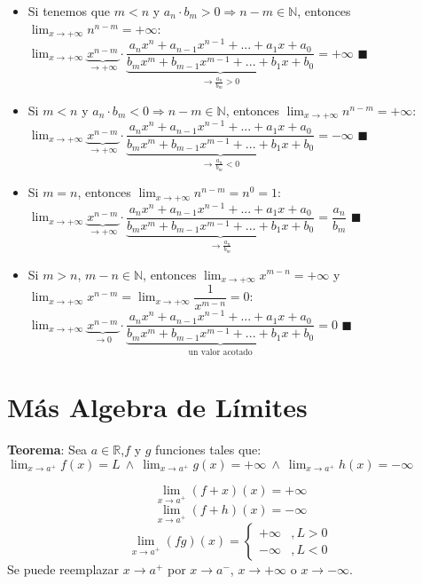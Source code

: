 \documentclass[11pt,a4paper]{article}
\newcommand*{\QEDA}{\null\nobreak\hfill\ensuremath{\blacksquare}}
\begin{document}
\begin{itemize}
\begin{itemize}
\item Si tenemos que $m<n$ y $a_n\cdot b_m > 0 \Rightarrow n-m \in \mathbb{N}$, entonces $\displaystyle{\lim_{x \to +\infty} n^{n-m} = +\infty}$:\\
$\displaystyle{\lim_{x \to +\infty} \underbrace{x^{n-m}}_{\to +\infty} \cdot \underbrace{\dfrac{a_nx^n + a_{n-1}x^{n-1} + ... + a_1x + a_0}{b_mx^m + b_{m-1}x^{m-1} + ... + b_1x + b_0}}_{\to \frac{a_n}{b_m} > 0} = +\infty}$ \QEDA
\item Si $m<n$ y $a_n\cdot b_m < 0 \Rightarrow n-m \in \mathbb{N}$, entonces $\displaystyle{\lim_{x \to +\infty} n^{n-m} = +\infty}$:\\
$\displaystyle{\lim_{x \to +\infty} \underbrace{x^{n-m}}_{\to +\infty} \cdot \underbrace{\dfrac{a_nx^n + a_{n-1}x^{n-1} + ... + a_1x + a_0}{b_mx^m + b_{m-1}x^{m-1} + ... + b_1x + b_0}}_{\to \frac{a_n}{b_m} < 0} = -\infty}$ \QEDA
\item Si $m=n$, entonces $\displaystyle{\lim_{x \to +\infty} n^{n-m} = n^0 = 1}$:\\
$\displaystyle{\lim_{x \to +\infty} \underbrace{x^{n-m}}_{\to +\infty} \cdot \underbrace{\dfrac{a_nx^n + a_{n-1}x^{n-1} + ... + a_1x + a_0}{b_mx^m + b_{m-1}x^{m-1} + ... + b_1x + b_0}}_{\to \frac{a_n}{b_m}} = \dfrac{a_n}{b_m}}$ \QEDA
\item Si $m>n$, $m-n \in \mathbb{N}$, entonces $\displaystyle{\lim_{x \to +\infty} x^{m-n} = +\infty}$ y
$\displaystyle{\lim_{x \to +\infty} x^{n-m} = \lim_{x \to +\infty} \dfrac{1}{x^{m-n}}} = 0$:\\
$\displaystyle{\lim_{x \to +\infty} \underbrace{x^{n-m}}_{\to 0} \cdot \underbrace{\dfrac{a_nx^n + a_{n-1}x^{n-1} + ... + a_1x + a_0}{b_mx^m + b_{m-1}x^{m-1} + ... + b_1x + b_0}}_{\text{ un valor acotado }} = 0}$ \QEDA
\end{itemize}
\end{itemize}

\section{M\'as Algebra de L\'imites}
\textbf{Teorema}: Sea $a\in\mathbb{R}$,$f$ y $g$ funciones tales que: $\displaystyle{\lim_{x \to a^+} f(x) = L}\ \land \ \displaystyle{\lim_{x \to a^+} g(x) = +\infty}\ \land\ \displaystyle{\lim_{x \to a^+} h(x) = -\infty} $ 


$$ \displaystyle{\lim_{x \to a^+} (f+x)(x) = +\infty}$$
$$ \displaystyle{\lim_{x \to a^+} (f+h)(x) = -\infty}$$
$$ \lim_{x \to a^+} (fg)(x) = \left\{\begin{array}{ll} +\infty &, L>0\\ -\infty &, L<0 \end{array}\right.$$
Se puede reemplazar $x\to a^+$ por $x\to a^-$, $x\to +\infty$ o $x\to -\infty$.
\end{document}
